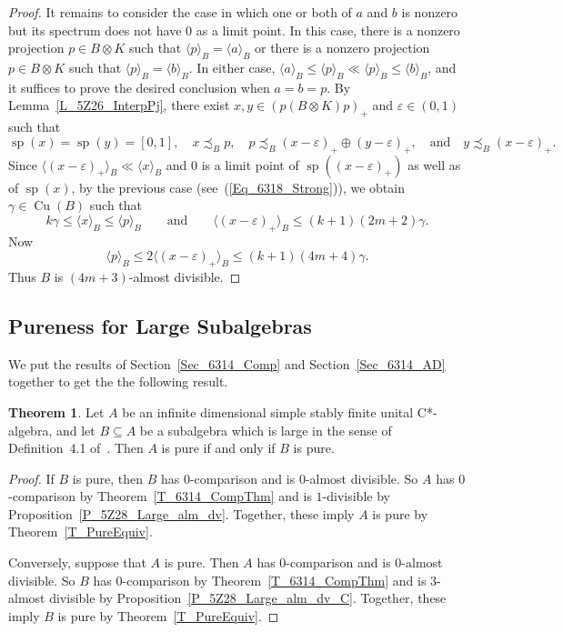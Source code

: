 \documentclass[10pt]{amsart}
\numberwithin{equation}{section}
\theoremstyle{definition}
\newtheorem{thm}{Theorem}[section]
\newcommand{\ep}{\varepsilon}
\newcommand{\spec}{{\operatorname{sp}}}
\newcommand{\Cu}{{\operatorname{Cu}}}
\newcommand{\andeqn}{\qquad {\mbox{and}} \qquad}
\newcommand{\uca}{unital C*-algebra}
\newcommand{\nzp}{nonzero projection}
\renewcommand{\S}{\subseteq}
\newcommand{\cc}[1]{\langle #1 \rangle}
\newcommand{\ccB}[1]{\langle #1 \rangle_B}
\begin{document}
\begin{proof}
It remains to consider the case in which
one or both of $a$ and $b$ is nonzero but
its spectrum does not have $0$ as a limit point.
In this case, there is a \nzp{} $p \in B \otimes K$
such that $\cc{p}_B = \cc{a}_B$ or there is a \nzp{}
$p \in B \otimes K$ such that $\cc{p}_B = \cc{b}_B$.
In either case, $\ccB{a} \leq \ccB{p} \ll \ccB{p} \leq \ccB{b}$,
and it suffices to prove the desired
conclusion when $a = b = p$.
By Lemma~\ref{L_5Z26_InterpPj}, there exist
$x, y \in (p (B \otimes K) p)_{+}$ and $\varepsilon \in (0, 1)$
such that
\[
\spec (x) = \spec (y) = [0, 1], \quad x \precsim_B p, \quad
p \precsim_B (x - \ep)_{+} \oplus (y - \ep)_{+},
\quad {\mbox{and}}
\quad y \precsim_B (x - \ep)_{+}.
\]
Since $\cc{(x - \ep)_{+}}_B \ll \cc{x}_B$ and $0$ is a
limit point of $\spec ((x - \ep)_{+})$ as well as of
$\spec (x)$, by the previous case (see~(\ref{Eq_6318_Strong})),
we obtain $\gamma \in \Cu (B)$ such that
%
\begin{equation*}
k \gamma \leq \cc{x}_B \leq \cc{p}_B
\andeqn
\cc{(x - \ep)_{+}}_B \leq (k + 1) (2 m + 2) \gamma.
\end{equation*}
%
Now
\[
\cc{p}_B \leq 2 \cc{(x - \ep)_{+}}_B
\leq (k + 1) (4 m + 4) \gamma.
\]
Thus $B$ is $(4m + 3)$-almost divisible.
\end{proof}

\subsection{Pureness for Large Subalgebras}\label{Sec_6327_Pure}

We put the results of Section~\ref{Sec_6314_Comp}
and Section~\ref{Sec_6314_AD} together to get the the following result.

\begin{thm}\label{T_LargePure}
Let $A$ be an infinite dimensional simple stably finite \uca,
and let $B \S A$ be a subalgebra which is large in the sense
of Definition~4.1 of~\cite{Phl40}.
Then $A$ is pure if and
only if $B$ is pure.
\end{thm}

\begin{proof}
If $B$ is pure, then $B$ has $0$-comparison and is $0$-almost
divisible.
So $A$ has $0$-comparison by
Theorem~\ref{T_6314_CompThm} and is $1$-divisible by
Proposition~\ref{P_5Z28_Large_alm_dv}.
Together, these imply $A$ is pure by Theorem~\ref{T_PureEquiv}.

Conversely, suppose that $A$ is pure.
Then $A$ has
$0$-comparison and is $0$-almost divisible.
So $B$ has $0$-comparison by Theorem~\ref{T_6314_CompThm}
and is $3$-almost divisible by Proposition~\ref{P_5Z28_Large_alm_dv_C}.
Together, these imply $B$ is pure by Theorem~\ref{T_PureEquiv}.
\end{proof}
\end{document}
